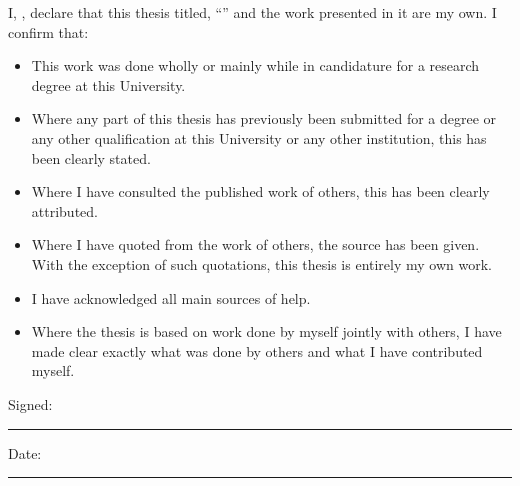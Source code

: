 \documentclass[
11pt, %
english, %
singlespacing, %
liststotoc, %
headsepline, %
]{MastersDoctoralThesis} %
\begin{document}

\begin{declaration}
\addchaptertocentry{\authorshipname}

\noindent I, \authorname, declare that this thesis titled, \enquote{\ttitle} and the work presented in it are my own. I confirm that:

\begin{itemize} 
\item This work was done wholly or mainly while in candidature for a research degree at this University.
\item Where any part of this thesis has previously been submitted for a degree or any other qualification at this University or any other institution, this has been clearly stated.
\item Where I have consulted the published work of others, this has been clearly attributed.
\item Where I have quoted from the work of others, the source has been given. With the exception of such quotations, this thesis is entirely my own work.
\item I have acknowledged all main sources of help.
\item Where the thesis is based on work done by myself jointly with others, I have made clear exactly what was done by others and what I have contributed myself.\\
\end{itemize}
 
\noindent Signed:\\
\rule[0.5em]{25em}{0.5pt} %
 
\noindent Date:\\
\rule[0.5em]{25em}{0.5pt} %
\end{declaration}

\cleardoublepage


\vspace*{0.2\textheight}

\end{document}
